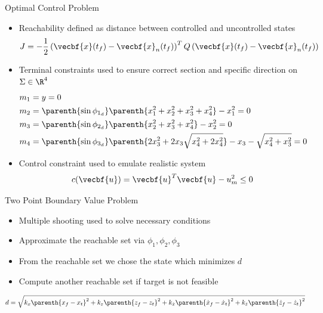 \begin{frame}{Optimal Control Problem}
\begin{itemize}
    \item Reachability defined as distance between controlled and uncontrolled states
    {\small
        \[
            J = -\frac{1}{2} \left( \vecbf{x}(t_f) - \vecbf{x}_{n}(t_f)\right)^T 
            Q
            \left( \vecbf{x}(t_f) - \vecbf{x}_{n}(t_f)\right) 
        \]
    }
    \pause
    \item Terminal constraints used to ensure correct section and specific direction on \( \Sigma \in \R^4 \)
    {\small
        \begin{align*}\label{eq:terminal_constraints}
            \begin{split}
                m_1 &= y = 0  \\
                m_2 &= \parenth{\sin \phi_{1_{d}}} \parenth{ x_1^2 + x_2^2 + x_3^2 + x_4^2} - x_1^2 = 0 \\
                m_3 &= \parenth{\sin \phi_{2_{d}}} \parenth{ x_2^2 + x_3^2 + x_4^2} - x_2^2 = 0\\
                m_4 &= \parenth{\sin \phi_{3_{d}}} \parenth{ 2 x_3^2 + 2 x_3 \sqrt{x_4^2 + 2 x_4^2}} - x_3 - \sqrt{x_4^2 + x_3^2} = 0 
            \end{split}
        \end{align*}
    }
    \pause
    \item Control constraint used to emulate realistic system
        {\small
        \[
            c(\vecbf{u}) = \vecbf{u}^T \vecbf{u} - u_m^2 \leq 0 
        \]
        }
\end{itemize}

\end{frame}

\begin{frame}{Two Point Boundary Value Problem}
\begin{itemize}
    \item Multiple shooting used to solve necessary conditions
    \pause
    \item Approximate the reachable set via \( \phi_1, \phi_2, \phi_3 \) 
    \pause
    \item From the reachable set we chose the state which minimizes \( d \) 
    \item Compute another reachable set if target is not feasible
\end{itemize}

\begin{align*}
    d = \sqrt{k_x \parenth{x_f - x_t }^2 + k_z \parenth{z_f - z_t }^2 + k_{\dot{x}}\parenth{\dot{x}_f - \dot{x}_t }^2 + k_{\dot{z}}\parenth{\dot{z}_f - \dot{z}_t }^2} 
\end{align*}

\end{frame}

